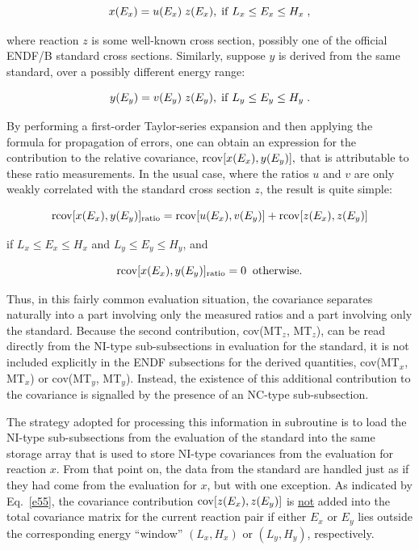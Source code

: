 \begin{equation}
x(E_x) = u(E_x) \; z(E_x), \;{\rm if} \; L_x \leq E_x \leq H_x \; ,
\end{equation}

\noindent
where reaction $z$ is some well-known cross section,
possibly one of the official ENDF/B standard cross sections.
Similarly, suppose $y$ is derived from the same standard, over a
possibly different energy range:

\begin{equation}
y(E_y) = v(E_y) \; z(E_y), \;{\rm if} \; L_y \leq E_y \leq H_y \; .
\end{equation}

\noindent
By performing a first-order Taylor-series expansion and then applying
the formula for propagation of errors, one can obtain an expression for the
contribution to the relative covariance, ${\rm r{\rm
cov}}[x(E_x),y(E_y)],$ that is attributable to these ratio measurements.
In the usual case, where the ratios $u$ and $v$ are only weakly
correlated with the standard cross section $z$, the result is quite
simple:

\begin{equation}
{\rm rcov}[x(E_x),y(E_y)]_{{\rm ratio}} = {\rm rcov}[u(E_x),v(E_y)] +
 {\rm rcov}[z(E_x),z(E_y)]
\end{equation}

\noindent
if $L_x \leq E_x \leq H_x$ and $L_y \leq E_y \leq H_y$, and

\begin{equation}
{\rm rcov} [x(E_x), y(E_y)]_{\rm ratio}= 0 \;\;{\rm otherwise}.
\label{e55}
\end{equation}

\noindent
Thus, in this fairly common evaluation situation, the covariance
separates naturally into a part involving only the measured ratios and
a part involving only the standard.  Because the second contribution,
cov(MT$_z$, MT$_z$), can be read directly from the NI-type
sub-subsections in evaluation for the standard, it is not included
explicitly in the ENDF subsections for the derived quantities,
cov(MT$_x$, MT$_x$) or cov(MT$_y$, MT$_y$).  Instead, the existence of
this additional contribution to the covariance is signalled by the
presence of an NC-type sub-subsection.

The strategy adopted for processing this information in
subroutine  is to load the
NI-type sub-subsections from the evaluation of the standard into
the same storage array that is used to store NI-type covariances
from the evaluation for reaction $x$.  From that point on, the data
from the standard are handled just as if they had come from the
evaluation for $x$, but with one exception.  As indicated by
Eq.~\ref{e55}, the covariance contribution
${\rm {\rm cov}}[z(E_x),z(E_y)]$ is \underline{not} added into
the total covariance matrix for the current reaction pair if
either $E_x$ or $E_y$ lies outside the corresponding energy
``window'' $(L_x,H_x)$ or $(L_y,H_y)$, respectively.

